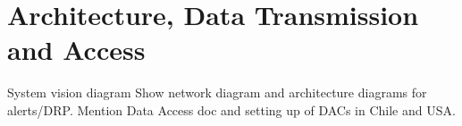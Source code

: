 \section {Architecture, Data Transmission and  Access } \label{sec:dataacess}
System vision diagram
Show network diagram and architecture diagrams for alerts/DRP. Mention Data Access doc  \cite{RDO-013} and
setting up of DACs in Chile and USA.
